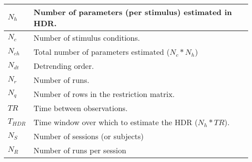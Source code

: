 \documentclass[12pt]{article}
\begin{document}
\begin{table}
\begin{center}
\begin{tabular}{|l|l|}
$N_h$ & Number of parameters (per stimulus) estimated in HDR.\\ \hline
$N_c$ & Number of stimulus conditions.\\ \hline
$N_{ch}$ & Total number of parameters estimated ($N_c * N_h$)\\ \hline 
$N_{dt}$ & Detrending order.\\ \hline 
$N_{r}$ & Number of runs.\\ \hline 
$N_q$ & Number of rows in the restriction matrix.\\ \hline
$TR$ & Time between observations.\\ \hline 
$T_{HDR}$ & Time window over which to estimate the HDR ($N_h * TR$).\\ \hline
$N_S$ & Number of sessions (or subjects)\\ \hline
$N_R$ & Number of runs per session    \\ \hline
\end{tabular}
\end{center}
\end{table}
\end{document}
